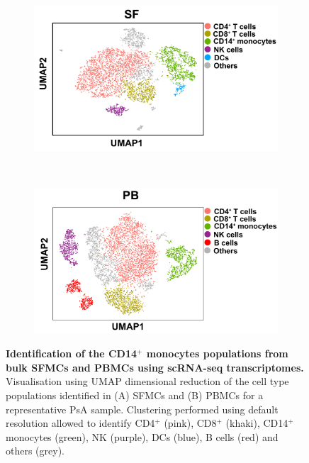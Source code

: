 \bigskip
\begin{figure}[htbp]
\centering
\begin{subfigure}[b]{0.48\textwidth}
\centering 
\includegraphics[width=\textwidth]{./Appendix/pdfs/Chapter5/PSA_monocytes_scanpy_single_cell_SF_all_cell_types}
\caption{}
\end{subfigure}%
~
\begin{subfigure}[b]{0.48\textwidth} 
\centering
\includegraphics[width=\textwidth]{./Appendix/pdfs/Chapter5/PSA_monocytes_scanpy_single_cell_PB_all_cell_types}
\caption{}
\end{subfigure}
\caption[Identification of the CD14$^+$ monocytes populations from bulk SFMCs and PBMCs using scRNA-seq transcriptomes.]{\textbf{Identification of the CD14$^+$ monocytes populations from bulk SFMCs and PBMCs using scRNA-seq transcriptomes.} Visualisation using UMAP dimensional reduction of the cell type populations identified in (A) SFMCs and (B) PBMCs for a representative PsA sample. Clustering performed using default resolution allowed to identify CD4$^+$ (pink), CD8$^+$ (khaki), CD14$^+$ monocytes (green), NK (purple), DCs (blue), B cells (red) and others (grey).}
\label{figure:PsA_scRNAseq_SF_an_PB_monocytes_identification_from_bulk}
\end{figure}



